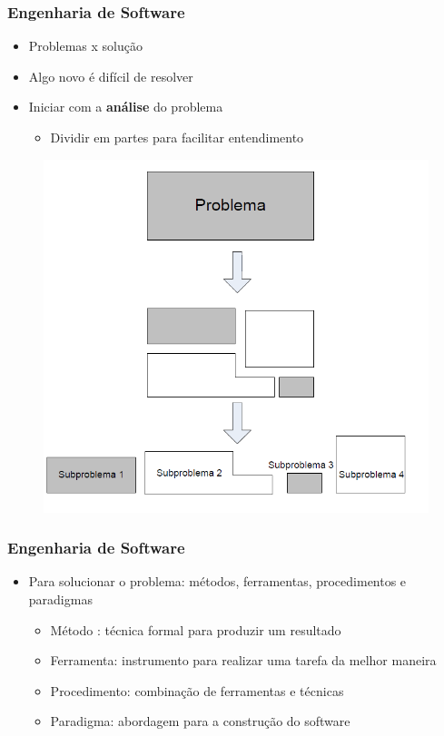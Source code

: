 \begin{frame}
\frametitle{Engenharia de Software}
\begin{itemize}
\item Problemas x solução
\item Algo novo é difícil de resolver
\item  Iniciar com a \textbf{análise} do problema
\begin{itemize}
 \item Dividir em partes para facilitar entendimento
\end{itemize}
\end{itemize}
\end{frame}

\begin{frame}
 \begin{figure}
  \includegraphics[height = \textheight]{figs/fig1.png}
 \end{figure}

\end{frame}


\begin{frame}
\frametitle{Engenharia de Software}
\begin{itemize}
\item Para solucionar o problema: métodos,
ferramentas, procedimentos e paradigmas
\begin{itemize}
 \item Método : técnica formal para produzir um
resultado
\item Ferramenta: instrumento para realizar uma tarefa
da melhor maneira
\item Procedimento: combinação de ferramentas e técnicas
\item Paradigma: abordagem para a construção do software
\end{itemize}
\end{itemize}
\end{frame}

